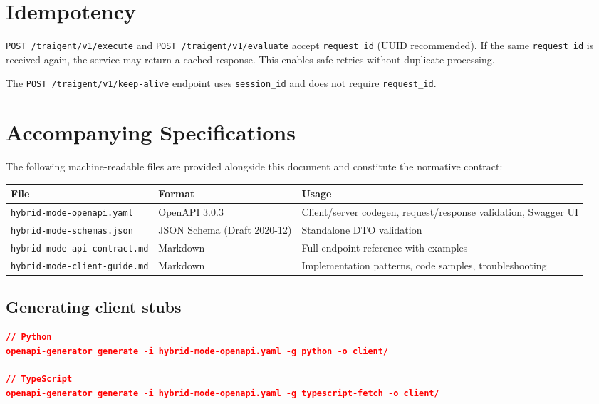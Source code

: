 \documentclass[11pt,a4paper]{article}
\newcommand{\field}[1]{\texttt{#1}}
\begin{document}
\section{Idempotency}

\texttt{POST /traigent/v1/execute} and \texttt{POST /traigent/v1/evaluate} accept \field{request\_id}
(UUID recommended). If the same \field{request\_id} is received again, the
service may return a cached response. This enables safe retries without
duplicate processing.

The \texttt{POST /traigent/v1/keep-alive} endpoint uses \field{session\_id} and does not
require \field{request\_id}.

\section{Accompanying Specifications}

The following machine-readable files are provided alongside this document and
constitute the normative contract:

\begin{center}\small
\begin{tabularx}{\textwidth}{@{}llX@{}}
\toprule
\textbf{File} & \textbf{Format} & \textbf{Usage} \\
\midrule
\texttt{hybrid-mode-openapi.yaml}   & OpenAPI 3.0.3 & Client/server codegen, request/response validation, Swagger UI \\
\texttt{hybrid-mode-schemas.json}   & JSON Schema (Draft 2020-12) & Standalone DTO validation \\
\texttt{hybrid-mode-api-contract.md}& Markdown & Full endpoint reference with examples \\
\texttt{hybrid-mode-client-guide.md}& Markdown & Implementation patterns, code samples, troubleshooting \\
\bottomrule
\end{tabularx}
\end{center}

\subsection{Generating client stubs}

\begin{lstlisting}[language=json,basicstyle=\ttfamily\footnotesize]
// Python
openapi-generator generate -i hybrid-mode-openapi.yaml -g python -o client/

// TypeScript
openapi-generator generate -i hybrid-mode-openapi.yaml -g typescript-fetch -o client/
\end{lstlisting}
\end{document}

